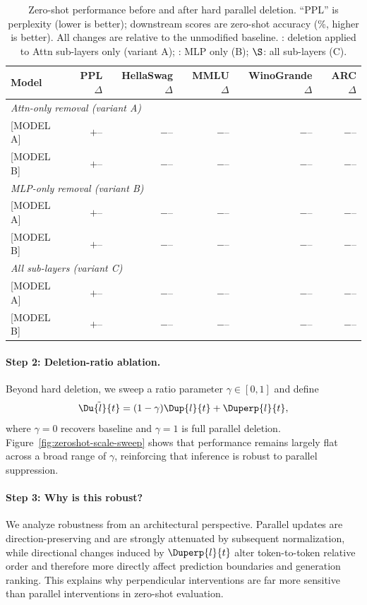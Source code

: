 \begin{table}[t]
  \caption{Zero-shot performance before and after hard parallel deletion.
           ``PPL'' is perplexity (lower is better);
           downstream scores are zero-shot accuracy (\%, higher is better).
           All changes are relative to the unmodified baseline.
           \textdagger: deletion applied to Attn sub-layers only (variant A);
           \textdaggerdbl: MLP only (B); $\S$: all sub-layers (C).}
  \label{tab:zeroshot}
  \centering
  \small
  \begin{tabular}{lrrrrr}
    \toprule
    Model & PPL $\Delta$ & HellaSwag $\Delta$ & MMLU $\Delta$ & WinoGrande $\Delta$ & ARC $\Delta$ \\
    \midrule
    \multicolumn{6}{l}{\textit{Attn-only removal (variant A)}} \\
    {[MODEL A]} & $+$-- & $-$-- & $-$-- & $-$-- & $-$-- \\
    {[MODEL B]} & $+$-- & $-$-- & $-$-- & $-$-- & $-$-- \\
    \midrule
    \multicolumn{6}{l}{\textit{MLP-only removal (variant B)}} \\
    {[MODEL A]} & $+$-- & $-$-- & $-$-- & $-$-- & $-$-- \\
    {[MODEL B]} & $+$-- & $-$-- & $-$-- & $-$-- & $-$-- \\
    \midrule
    \multicolumn{6}{l}{\textit{All sub-layers (variant C)}} \\
    {[MODEL A]} & $+$-- & $-$-- & $-$-- & $-$-- & $-$-- \\
    {[MODEL B]} & $+$-- & $-$-- & $-$-- & $-$-- & $-$-- \\
    \bottomrule
  \end{tabular}
\end{table}

\paragraph{Step 2: Deletion-ratio ablation.}
Beyond hard deletion, we sweep a ratio parameter $\gamma\in[0,1]$ and define
\begin{equation}
  \tilde{\Du{l}{t}} = (1-\gamma)\Dup{l}{t} + \Duperp{l}{t},
\end{equation}
where $\gamma=0$ recovers baseline and $\gamma=1$ is full parallel deletion.
Figure~\ref{fig:zeroshot-scale-sweep} shows that performance remains largely
flat across a broad range of $\gamma$, reinforcing that inference is robust to
parallel suppression.

\paragraph{Step 3: Why is this robust?}
We analyze robustness from an architectural perspective. Parallel updates are
direction-preserving and are strongly attenuated by subsequent normalization,
while directional changes induced by $\Duperp{l}{t}$ alter token-to-token
relative order and therefore more directly affect prediction boundaries and
generation ranking. This explains why perpendicular interventions are far more
sensitive than parallel interventions in zero-shot evaluation.

